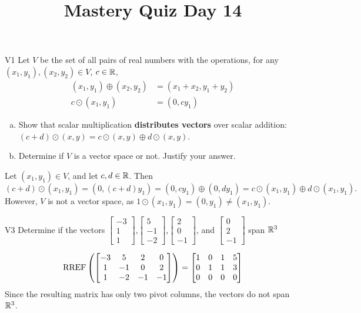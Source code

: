 \documentclass{sbgLAquiz}
\title{Mastery Quiz Day 14 }
\begin{document}
\begin{problem}{V1}
Let $V$ be the set of all pairs of real numbers with the operations, for any $(x_1,y_1), (x_2,y_2) \in V$, $c \in \mathbb{R}$,
\begin{align*}
(x_1,y_1) \oplus (x_2,y_2) &= (x_1+x_2,y_1+y_2) \\
c \odot (x_1,y_1) &= (0, cy_1)
\end{align*}
\begin{enumerate}[(a)]
\item Show that scalar multiplication
      \textbf{distributes vectors} over scalar addition:
      \((c+d)\odot(x,y)=
      c\odot(x,y) \oplus d\odot(x,y)\).
\item Determine if $V$ is a vector space or not.  Justify your answer.
\end{enumerate}
\end{problem}
\begin{solution}
Let $(x_1,y_1) \in V$, and let $c,d \in \mathbb{R}$.  Then
$$(c+d)\odot (x_1,y_1)=(0, (c+d)y_1) = (0,cy_1) \oplus (0,dy_1) = c \odot (x_1,y_1) \oplus d \odot (x_1,y_1).$$
However, $V$ is not a vector space, as $1 \odot (x_1,y_1) = (0,y_1) \neq (x_1,y_1)$.
\end{solution}


\begin{problem}{V3}
Determine if the vectors  $\begin{bmatrix} -3 \\ 1 \\ 1 \end{bmatrix}$,$\begin{bmatrix} 5 \\ -1 \\ -2 \end{bmatrix}$,$\begin{bmatrix}2 \\ 0 \\ -1 \end{bmatrix}$, and $\begin{bmatrix} 0 \\ 2 \\ -1\end{bmatrix}$ span $\mathbb{R}^3$
\end{problem}
\begin{solution}
$$\operatorname{RREF}\left(\begin{bmatrix}
-3 & 5 & 2 & 0 \\ 1 & -1 & 0 & 2 \\ 1 & -2 & -1 & -1 \end{bmatrix}\right)=\begin{bmatrix} 1 & 0 & 1 & 5 \\ 0 & 1 & 1 & 3 \\ 0 & 0 & 0 & 0\end{bmatrix}$$
Since the resulting matrix has only two pivot columns, the vectors do not span $\mathbb{R}^3$.
\end{solution}
\end{document}
